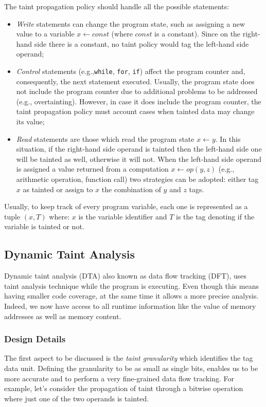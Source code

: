 \documentclass[LaM,binding=0.6cm]{sapthesis}
\begin{document}
The taint propagation policy should handle all the possible statements:
\begin{itemize}
\item \textit{Write} statements can change the program state, such as assigning a new value to a variable $x \leftarrow const$ (where $const$ is a constant). Since on the right-hand side there is a constant, no taint policy would tag the left-hand side operand;
\item \textit{Control} statements (e.g.,\texttt{while}, \texttt{for}, \texttt{if}) affect the program counter and, consequently, the next statement executed. Usually, the program state does not include the program counter due to additional problems to be addressed (e.g., overtainting). However, in case it does include the program counter, the taint propagation policy must account cases when tainted data may change its value;
\item \textit{Read} statements are those which read the program state $x \leftarrow y$. In this situation, if the right-hand side operand is tainted then the left-hand side one will be tainted as well, otherwise it will not. When the left-hand side operand is assigned a value returned from a computation $x \leftarrow op(y, z)$ (e.g., arithmetic operation, function call) two strategies can be adopted: either tag $x$ as tainted or assign to $x$ the combination of $y$ and $z$ tags.
\end{itemize}
Usually, to keep track of every program variable, each one is represented as a tuple $(x, T)$ where: $x$ is the variable identifier and $T$ is the tag denoting if the variable is tainted or not. 

\subsection{Dynamic Taint Analysis}
\label{sec:dta}
Dynamic taint analysis (DTA) also known as data flow tracking (DFT), uses taint analysis technique while the program is executing. Even though this means having smaller code coverage, at the same time it allows a more precise analysis. Indeed, we now have access to all runtime information like the value of memory addresses as well as memory content.

\subsubsection{Design Details}
The first aspect to be discussed is the \textit{taint granularity} which identifies the tag data unit. Defining the granularity to be as small as single bits, enables us to be more accurate and to perform a very fine-grained data flow tracking. For example, let's consider the propagation of taint through a bitwise operation where just one of the two operands is tainted.
\end{document}

